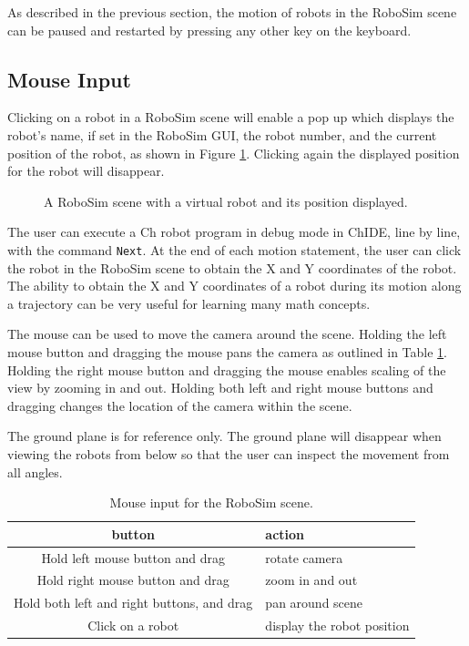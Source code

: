 \documentclass{article}
\begin{document}
As described in the previous section, the motion of robots in the RoboSim scene
can be paused and restarted by pressing any other key on the keyboard.

\subsection{Mouse Input}
Clicking on a robot in a RoboSim scene will enable a pop up which displays the
robot's name, if set in the RoboSim GUI, the robot number, and the current
position of the robot, as shown in Figure \ref{fig:robosim_pos}.  Clicking again
the displayed position for the robot will disappear.
\begin{figure}[H]
	\begin{center}
	\end{center}
	\caption{A RoboSim scene with a virtual robot and its position displayed.}
	\label{fig:robosim_pos}
\end{figure}

The user can execute a Ch robot program in debug mode in ChIDE, line by line,
with the command {\tt Next}. At the end of each motion statement, the user can
click the robot in the RoboSim scene to obtain the X and Y coordinates of the
robot.  The ability to obtain the X and Y coordinates of a robot during its
motion along a trajectory can be very useful for learning many math concepts.

The mouse can be used to move the camera around the scene.  Holding the left
mouse button and dragging the mouse pans the camera as outlined in Table
\ref{tab:buttons}.  Holding the right mouse button and dragging the mouse
enables scaling of the view by zooming in and out.  Holding both left and right
mouse buttons and dragging changes the location of the camera within the scene.

The ground plane is for reference only.  The ground plane will disappear when
viewing the robots from below so that the user can inspect the movement from all
angles.

\begin{table}[H]
	\begin{center}
	\begin{tabular}{c | l }
		\hline \hline
		\textbf{button} & \textbf{action} \\ \hline
		Hold left mouse button and drag& rotate camera \\
		Hold right mouse button and drag& zoom in and out \\
		Hold both left and right buttons,  and drag & pan around scene \\
		Click on a robot & display the robot position\\
		\hline \hline
	\end{tabular}
	\caption{Mouse input for the RoboSim scene.}
	\label{tab:buttons}
	\end{center}
\end{table}
\end{document}
